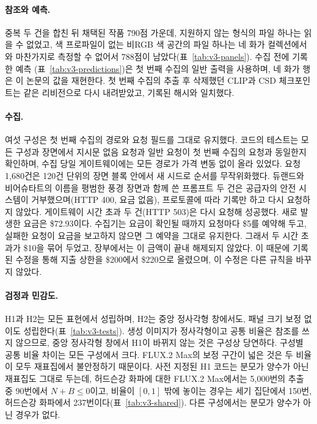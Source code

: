 

\paragraph{참조와 예측.} 중복 두 건을 합친 뒤 채택된 작품 790점 가운데, 지원하지 않는 형식의 파일
하나는 읽을 수 없었고, 색 프로파일이 없는 비RGB 색 공간의 파일 하나는 네 화가 컬렉션에서와 마찬가지로
측정할 수 없어서 788점이 남았다(표~\ref{tab:v3-panels}). 수집 전에 기록한 예측
(표~\ref{tab:v3-predictions})은 첫 번째 수집의 일반 출력을 사용하며, 네 화가 행은 이 논문의 값을
재현한다. 첫 번째 수집의 추출 후 삭제했던 CLIP과 CSD 체크포인트는 같은 리비전으로 다시 내려받았고,
기록된 해시와 일치했다.



\paragraph{수집.} 여섯 구성은 첫 번째 수집의 경로와 요청 필드를 그대로 유지했다. 코드의 테스트는 모든
구성과 장면에서 지시문 없음 요청과 일반 요청이 첫 번째 수집의 요청과 동일한지 확인하며, 수집 당일
게이트웨이에는 모든 경로가 가격 변동 없이 올라 있었다. 요청 1,680건은 120건 단위의 장면 블록 안에서 새
시드로 순서를 무작위화했다. 듀랜드와 비어슈타트의 이름을 평범한 풍경 장면과 함께 쓴 프롬프트 두 건은
공급자의 안전 시스템이 거부했으며(HTTP 400, 요금 없음), 프로토콜에 따라 기록만 하고 다시 요청하지
않았다. 게이트웨이 시간 초과 두 건(HTTP 503)은 다시 요청해 성공했다. 새로 발생한 요금은 \$72.93이다.
수집기는 요금이 확인될 때까지 요청마다 \$5를 예약해 두고, 실패한 요청이 요금을 보고하지 않으면 그
예약을 그대로 유지한다. 그래서 두 시간 초과가 \$10을 묶어 두었고, 장부에서는 이 금액이 끝내 해제되지
않았다. 이 때문에 기록된 수정을 통해 지출 상한을 \$200에서 \$220으로 올렸으며, 이 수정은 다른 규칙을
바꾸지 않았다.



\paragraph{검정과 민감도.} H1과 H2는 모든 표현에서 성립하며, H2는 중앙 정사각형 창에서도, 패널 크기
보정 없이도 성립한다(표~\ref{tab:v3-tests}). 생성 이미지가 정사각형이고 공통 비율은 참조를 쓰지
않으므로, 중앙 정사각형 창에서 H1이 바뀌지 않는 것은 구성상 당연하다. 구성별 공통 비율 차이는 모든
구성에서 크다. FLUX.2 Max의 보정 구간이 넓은 것은 두 비율이 모두 재표집에서 불안정하기 때문이다. 사전
지정된 H1 코드는 분모가 양수가 아닌 재표집도 그대로 두는데, 허드슨강 화파에 대한 FLUX.2 Max에서는
5,000번의 추출 중 90번에서 $N+B\le0$이고, 비율이 $[0,1]$ 밖에 놓이는 경우는 세기 집단에서 150번,
허드슨강 화파에서 237번이다(표~\ref{tab:v3-shared}). 다른 구성에서는 분모가 양수가 아닌 경우가 없다.

